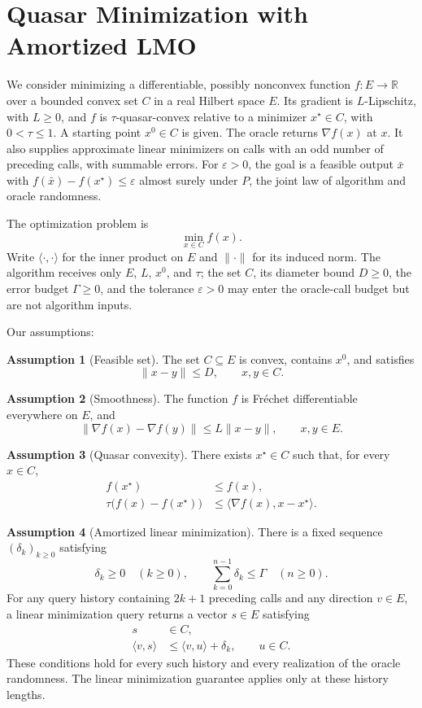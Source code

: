\documentclass[10pt]{article}
\theoremstyle{definition}
\newtheorem{assumption}{Assumption}
\begin{document}
\section*{Quasar Minimization with Amortized LMO}
We consider minimizing a differentiable, possibly nonconvex function $f:E\to\mathbb{R}$ over a bounded convex set $C$ in a real Hilbert space $E$. Its gradient is $L$-Lipschitz, with $L\geq0$, and $f$ is $\tau$-quasar-convex relative to a minimizer $x^\star\in C$, with $0<\tau\leq1$. A starting point $x^0\in C$ is given. The oracle returns $\nabla f(x)$ at $x$. It also supplies approximate linear minimizers on calls with an odd number of preceding calls, with summable errors. For $\varepsilon>0$, the goal is a feasible output $\bar{x}$ with $f(\bar{x})-f(x^\star)\leq\varepsilon$ almost surely under $P$, the joint law of algorithm and oracle randomness.

The optimization problem is
\[
\min_{x\in C} f(x).
\]
Write $\langle\cdot,\cdot\rangle$ for the inner product on $E$ and $\|\cdot\|$ for its induced norm. The algorithm receives only $E$, $L$, $x^0$, and $\tau$; the set $C$, its diameter bound $D\geq0$, the error budget $\Gamma\geq0$, and the tolerance $\varepsilon>0$ may enter the oracle-call budget but are not algorithm inputs.

Our assumptions:
\begin{assumption}[Feasible set]
The set $C\subseteq E$ is convex, contains $x^0$, and satisfies
\[
\|x-y\|\leq D,
\qquad x,y\in C.
\]
\end{assumption}

\begin{assumption}[Smoothness]
The function $f$ is Fr\'echet differentiable everywhere on $E$, and
\[
\|\nabla f(x)-\nabla f(y)\|\leq L\|x-y\|,
\qquad x,y\in E.
\]
\end{assumption}

\begin{assumption}[Quasar convexity]
There exists $x^\star\in C$ such that, for every $x\in C$,
\[
\begin{aligned}
f(x^\star)&\leq f(x),\\
\tau\bigl(f(x)-f(x^\star)\bigr)
&\leq\langle\nabla f(x),x-x^\star\rangle.
\end{aligned}
\]
\end{assumption}

\begin{assumption}[Amortized linear minimization]
There is a fixed sequence $(\delta_k)_{k\geq0}$ satisfying
\[
\delta_k\geq0\quad(k\geq0),
\qquad
\sum_{k=0}^{n-1}\delta_k\leq\Gamma\quad(n\geq0).
\]
For any query history containing $2k+1$ preceding calls and any direction $v\in E$, a linear minimization query returns a vector $s\in E$ satisfying
\[
\begin{aligned}
s&\in C,\\
\langle v,s\rangle&\leq\langle v,u\rangle+\delta_k,
\qquad u\in C.
\end{aligned}
\]
These conditions hold for every such history and every realization of the oracle randomness. The linear minimization guarantee applies only at these history lengths.
\end{assumption}
\end{document}
